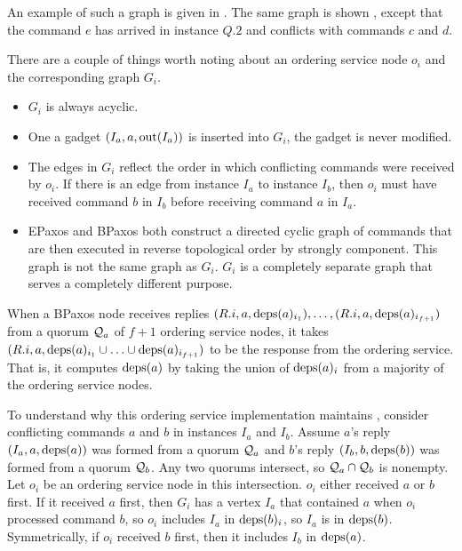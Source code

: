 An example of such a graph is given in
. The same graph is shown
, except that the command $e$ has
arrived in instance $Q.2$ and conflicts with commands $c$ and $d$.

{}

There are a couple of things worth noting about an ordering service node $o_i$
and the corresponding graph $G_i$.
\begin{itemize}
  \item
    $G_i$ is always acyclic.
  \item
    One a gadget $(I_a, a, \text{out}(I_a))$ is inserted into $G_i$, the gadget is
    never modified.
  \item
    The edges in $G_i$ reflect the order in which conflicting commands were
    received by $o_i$. If there is an edge from instance $I_a$ to instance
    $I_b$, then $o_i$ must have received command $b$ in $I_b$ before receiving
    command $a$ in $I_a$.
  \item
    EPaxos and BPaxos both construct a directed cyclic graph of commands that
    are then executed in reverse topological order by strongly component. This
    graph is not the same graph as $G_i$.  $G_i$ is a completely separate graph
    that serves a completely different purpose.
\end{itemize}

When a BPaxos node receives replies $(R.i, a, \text{deps}(a)_{i_1}), \ldots, (R.i, a,
\text{deps}(a)_{i_{f+1}})$ from a quorum $\mathcal{Q}_a$ of $f + 1$ ordering service
nodes, it takes $(R.i, a, \text{deps}(a)_{i_1} \cup \ldots \cup \text{deps}(a)_{i_{f+1}})$
to be the response from the ordering service. That is, it computes $\text{deps}(a)$
by taking the union of $\text{deps}(a)_i$ from a majority of the ordering service
nodes.

To understand why this ordering service implementation maintains
, consider conflicting commands $a$ and $b$ in
instances $I_a$ and $I_b$. Assume $a$'s reply $(I_a, a, \text{deps}(a))$ was formed
from a quorum $\mathcal{Q}_a$ and $b$'s reply $(I_b, b, \text{deps}(b))$ was formed from
a quorum $\mathcal{Q}_b$. Any two quorums intersect, so $\mathcal{Q}_a \cap \mathcal{Q}_b$
is nonempty. Let $o_i$ be an ordering service node in this intersection. $o_i$
either received $a$ or $b$ first. If it received $a$ first, then $G_i$ has a
vertex $I_a$ that contained $a$ when $o_i$ processed command $b$, so $o_i$
includes $I_a$ in $\text{deps}(b)_i$, so $I_a$ is in $\text{deps}(b)$. Symmetrically, if
$o_i$ received $b$ first, then it includes $I_b$ in $\text{deps}(a)$.

